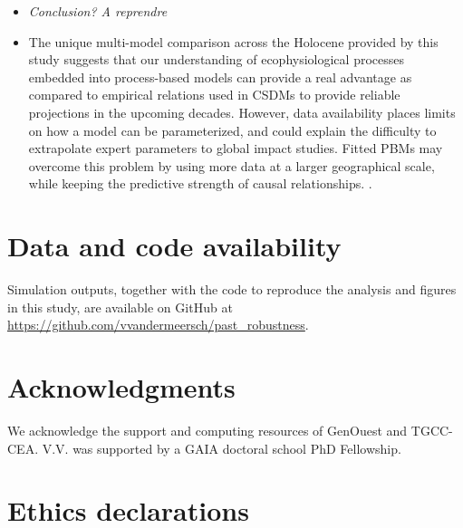 \documentclass[pdflatex, sn-nature]{sn-jnl}%
\begin{document}
\begin{itemize}
\item \emph{Conclusion? A reprendre}\par
\item The unique multi-model comparison across the Holocene provided by this study suggests that our understanding of ecophysiological processes embedded into process-based models can provide a real advantage as compared to empirical relations used in CSDMs to provide reliable projections in the upcoming decades. However, data availability places limits on how a model can be parameterized, and could explain the difficulty to extrapolate expert parameters to global impact studies. Fitted PBMs may overcome this problem by using more data at a larger geographical scale, while keeping the predictive strength of causal relationships. . 
\end{itemize}

\backmatter

\section*{Data and code availability}

Simulation outputs, together with the code to reproduce the analysis and figures in this study, are available on GitHub at \url{https://github.com/vvandermeersch/past_robustness}.

\section*{Acknowledgments}

We acknowledge the support and computing resources of GenOuest and TGCC-CEA. V.V. was supported by a GAIA doctoral school PhD Fellowship.

\section*{Ethics declarations}
\end{document}
